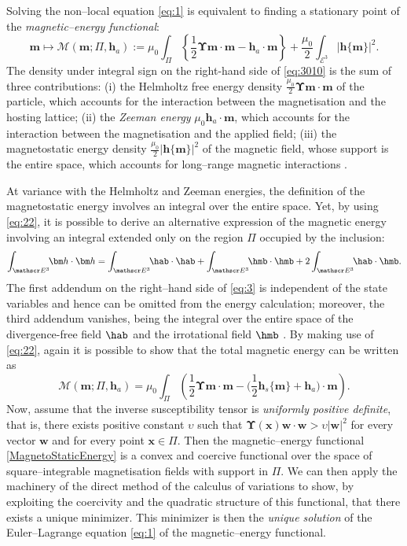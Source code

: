 \documentclass[oneside]{article}
\begin{document}
Solving the non--local equation \eqref{eq:1} is equivalent to finding a stationary point of the \emph{magnetic--energy functional}:
\begin{equation}\label{eq:3010}
\bm m\mapsto\mathcal M(\bm m;\Pi,\bm h_a):=\mu_0\int_{\Pi}\left\{\frac 12 \bm\Upsilon\bm m\cdot\bm m-\bm h_a\cdot\bm m\right\}+\frac{\mu_0}{2}\int_{\mathscr E^3}|\bm h\{\bm m\}|^2.
\end{equation}
The density under integral sign on the right-hand side of \eqref{eq:3010} is the sum of three contributions: (i) the Helmholtz free energy density $\frac {\mu_0}2{\bm\Upsilon\bm m\cdot\bm m}$ of the particle, which accounts for the interaction between the magnetisation and the hosting lattice; (ii) the  \emph{Zeeman energy} $\mu_0\bm h_a \cdot \bm m$, which accounts for the interaction between the magnetisation and the applied field; (iii) the magnetostatic energy density $\frac{\mu_0}{2}|\bm h\{\bm m\}|^2$ of the magnetic field, whose support is the entire space, which accounts for long--range magnetic interactions \cite{Hubert1998}. 


At variance with the Helmholtz and Zeeman energies, the definition of the magnetostatic energy involves an integral over the entire space. Yet,  by using  \eqref{eq:22}, it is possible to derive an alternative  expression  of the magnetic energy involving an integral extended only on the  region $\Pi$ occupied by the inclusion:
\begin{equation}\label{eq:3}
\int_{\mathscr E^3} \!\! \bm h \cdot \bm h = \int_{\mathscr E^3}\!\! \hab\cdot \hab + \int_{\mathscr E^3}\!\! \hmb\cdot \hmb +2 \int_{\mathscr E^3}\!\! \hab\cdot \hmb.
\end{equation} 
The first addendum on the right--hand side of \eqref{eq:3} is independent of the state variables and hence can be omitted from the energy calculation; moreover,  the third addendum vanishes, being the integral over the entire space of the divergence-free field $\hab$ and the irrotational field $\hmb$ \cite{Hubert1998}. By making use of \eqref{eq:22}, again it is possible to show \cite{Brown1962} that the total magnetic energy can be written as
\begin{equation}\label{MagnetoStaticEnergy}
\mathcal M(\bm m;\Pi,\bm h_a)=\mu_0\int_{\Pi}\left(\frac 12 \bm\Upsilon\bm m\cdot\bm m-\Big(\frac 12 \bm h_s\{\bm m\}+\bm h_a\Big)\cdot\bm m\right).
\end{equation}
Now, assume that the inverse susceptibility tensor is \emph{uniformly positive definite}, that is, there exists positive constant $\upsilon$ such that ${\bm \Upsilon(\bm x)\bm w\cdot\bm w}>\upsilon{|\bm w|^2}$ for every vector $\bm w$ and for every point $\bm x\in\Pi$. Then  the magnetic--energy functional \eqref{MagnetoStaticEnergy} is a convex and coercive  functional over the space of square--integrable magnetisation fields with support in $\Pi$. We can then apply the machinery of the direct method of the calculus of variations to show, by exploiting the coercivity and the quadratic structure of this functional, that there exists a unique minimizer. This minimizer is then the \textit{unique solution} of the Euler--Lagrange equation \eqref{eq:1} of the magnetic--energy functional. 
\end{document}
